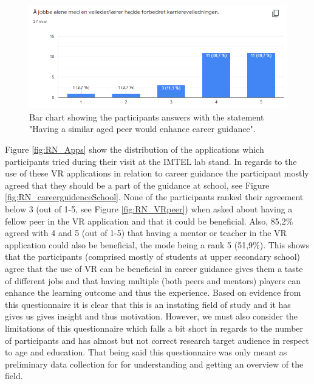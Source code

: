 \begin{figure}[!h]
    \centering
    \captionsetup{width=.7\linewidth}
    \includegraphics[width=.8\textwidth]{./fig/phase_1/researcherNight/RN_careerguidenceMentor.PNG}
    \caption{Bar chart showing the participants answers with the statement "Having a similar aged peer would enhance career guidance".}
    \label{fig:phase1RNPeer}
\end{figure}

Figure \ref{fig:RN_Apps} show the distribution of the applications which participants tried during their visit at the IMTEL lab stand.  In regards to the use of these VR applications in relation to career guidance the participant mostly agreed that they should be a part of the guidance at school, see Figure \ref{fig:RN_careerguidenceSchool}. None of the participants ranked their agreement below 3 (out of 1-5, see Figure \ref{fig:RN_VRpeer}) when asked about having a fellow peer in the VR application and that it could be beneficial. Also, 85,2\% agreed with 4 and 5 (out of 1-5) that having a mentor or teacher in the VR application could also be beneficial, the mode being a rank 5 (51,9\%).
This shows that the participants (comprised mostly of students at upper secondary school) agree that the use of VR can be beneficial in career guidance gives them a taste of different jobs and that having multiple (both peers and mentors) players can enhance the learning outcome and thus the experience. Based on evidence from this questionnaire it is clear that this is an instating field of study and it has gives us gives insight and thus motivation. However, we must also consider the limitations of this questionnaire which falls a bit short in regards to the number of participants and has almost but not correct research target audience in respect to age and education. That being said this questionnaire was only meant as preliminary data collection for for understanding and getting an overview of the field.          

